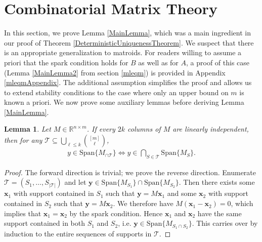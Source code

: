 \documentclass[journal, onecolumn]{IEEEtran}
\newtheorem{lemma}{Lemma}
\begin{document}

\appendices
\section{Combinatorial Matrix Theory}

In this section, we prove Lemma \ref{MainLemma}, which was a main ingredient in our proof of Theorem \ref{DeterministicUniquenessTheorem}. We suspect that there is an appropriate generalization to matroids. For readers willing to assume a priori that the spark condition holds for $B$ as well as for $A$, a proof of this case (Lemma \ref{MainLemma2} from section \ref{mleqm}) is provided in Appendix \ref{mleqmAppendix}. The additional assumption simplifies the proof and allows us to extend stability conditions to the case where only an upper bound on $m$ is known a priori. We now prove some auxiliary lemmas before deriving Lemma \ref{MainLemma}.


\begin{lemma}\label{SpanIntersectionLemma}
Let $M \in \mathbb{R}^{n \times m}$. If every $2k$ columns of $M$ are linearly independent, then for any $\mathcal{T} \subseteq \bigcup_{\ell \leq k} {[m] \choose \ell}$,
\begin{align}
y \in \text{Span}\{M_{\cap \mathcal{T}}\}  \Longleftrightarrow y \in \bigcap_{S \in \mathcal{T}} \text{Span}\{M_S\}.
\end{align}
\end{lemma}

\begin{proof}The forward direction is trivial; we prove the reverse direction. Enumerate $\mathcal{T} = (S_1, \ldots, S_{|\mathcal{T}|})$ and let $\mathbf{y} \in \text{Span}\{M_{S_1}\} \cap \text{Span}\{M_{S_2}\}$. Then there exists some $\mathbf{x}_1$ with support contained in $S_1$ such that $\mathbf{y} = M\mathbf{x}_1$ and some $\mathbf{x}_2$ with support contained in $S_2$ such that $\mathbf{y} = M\mathbf{x}_2$. We therefore have $M(\mathbf{x}_1 - \mathbf{x}_2) = 0$, which implies that $\mathbf{x}_1 = \mathbf{x}_2$ by the spark condition. Hence $\mathbf{x}_1$ and $\mathbf{x}_2$ have the same support contained in both $S_1$ and $S_2$, i.e. $\mathbf{y} \in \text{Span}\{M_{S_1 \cap S_2}\}$. This carries over by induction to the entire sequences of supports in $\mathcal{T}$. 
\end{proof}
\end{document}
